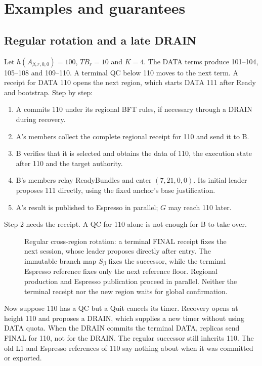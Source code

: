 \documentclass[11pt,a4paper]{article}
\newcommand{\TB}{\mathit{TB}}
\begin{document}
\section{Examples and guarantees}
\label{sec:examples}
\subsection{Regular rotation and a late DRAIN}
\label{sec:regular-example}
Let $h(A_{\beta,r,0,0})=100$, $\TB_r=10$ and $K=4$. The DATA terms produce
101--104, 105--108 and 109--110. A terminal QC below 110 moves to the next
term. A receipt for DATA 110 opens the next region, which starts DATA 111
after Ready and bootstrap. Step by step:
\begin{enumerate}
\item A commits 110 under its regional BFT rules, if necessary through a
DRAIN during recovery.
\item A's members collect the complete regional receipt for 110 and send
it to B.
\item B verifies that it is selected and obtains the data of 110, the
execution state after 110 and the target authority.
\item B's members relay ReadyBundles and enter $(7,21,0,0)$.
Its initial leader proposes 111 directly, using the fixed anchor's
base justification.
\item A's result is published to Espresso in parallel; $G$ may reach 110
later.
\end{enumerate}
Step 2 needs the receipt. A QC for 110 alone is not enough for B to take
over.

\begin{figure}[htbp]\centering

\caption{Regular cross-region rotation: a terminal FINAL receipt fixes
the next session, whose leader proposes directly after entry. The immutable branch map $S_\beta$ fixes the successor, while
the terminal Espresso reference fixes only the next reference floor.
Regional production and Espresso publication proceed in parallel. Neither
the terminal receipt nor the new region waits for global confirmation.}
\label{fig:regular-cross-region}
\end{figure}
\FloatBarrier

Now suppose 110 has a QC but a Quit cancels its timer. Recovery opens at
height 110 and proposes a DRAIN, which supplies a new timer without using
DATA quota. When the DRAIN commits the terminal DATA, replicas send FINAL
for 110, not for the DRAIN. The regular successor still inherits 110. The
old L1 and Espresso references of 110 say nothing about when it was
committed or exported.
\end{document}
